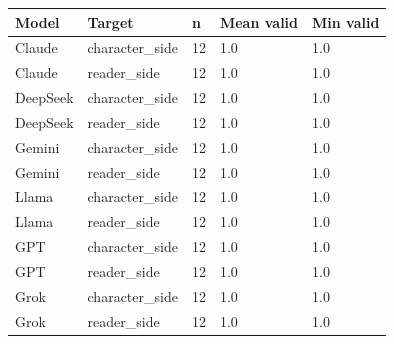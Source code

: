 \begin{tabular}{lllll}
\hline
Model & Target & n & Mean valid & Min valid \\
\hline
Claude & character\_side & 12 & 1.0 & 1.0 \\
Claude & reader\_side & 12 & 1.0 & 1.0 \\
DeepSeek & character\_side & 12 & 1.0 & 1.0 \\
DeepSeek & reader\_side & 12 & 1.0 & 1.0 \\
Gemini & character\_side & 12 & 1.0 & 1.0 \\
Gemini & reader\_side & 12 & 1.0 & 1.0 \\
Llama & character\_side & 12 & 1.0 & 1.0 \\
Llama & reader\_side & 12 & 1.0 & 1.0 \\
GPT & character\_side & 12 & 1.0 & 1.0 \\
GPT & reader\_side & 12 & 1.0 & 1.0 \\
Grok & character\_side & 12 & 1.0 & 1.0 \\
Grok & reader\_side & 12 & 1.0 & 1.0 \\
\hline
\end{tabular}
